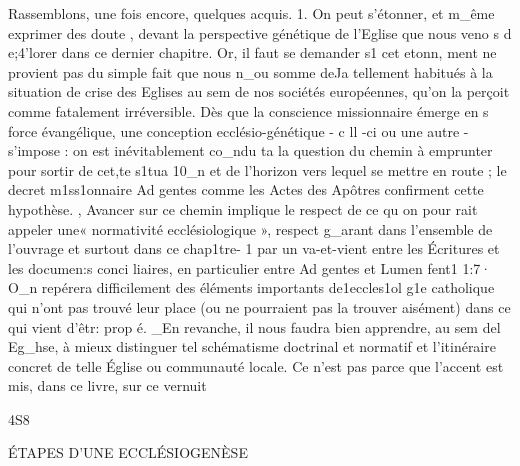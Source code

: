 {Rassemblons, une fois encore, quelques acquis.
1.	On peut s'étonner, et m_ême exprimer des doute , devant la perspective génétique de l'Eglise que nous veno s d e;4'lorer dans ce dernier chapitre. Or, il faut se demander s1 cet etonn, ment ne provient pas du simple fait que nous n_ou somme deJa tellement habitués à la situation de crise des Eglises au sem de nos sociétés européennes, qu'on la perçoit comme fatalement irréversible. Dès que la conscience missionnaire émerge en s force évangélique, une conception ecclésio-génétique -	c ll -ci ou une autre -	s'impose : on est inévitablement co_ndu ta la question du chemin à emprunter pour sortir de cet,te s1tua 10_n et de l'horizon vers lequel se mettre en route ; le decret m1ss1onnaire Ad gentes comme les Actes des Apôtres confirment cette
hypothèse.	,
Avancer sur ce chemin implique le respect de ce qu on pour
rait appeler une« normativité ecclésiologique », respect g_arant dans l'ensemble de l'ouvrage et surtout dans ce chap1tre- 1 par un va-et-vient entre les Écritures et les documen:s conci­
liaires, en particulier entre Ad gentes et Lumen fent1 1:7· O_n repérera difficilement des éléments importants de1eccles1ol g1e catholique qui n'ont pas trouvé leur place (ou ne pourraient pas la trouver aisément) dans ce qui vient d'êtr: prop é. _En revanche, il nous faudra bien apprendre, au sem del  Eg_hse, à mieux distinguer tel schématisme doctrinal et normatif et l'itinéraire concret de telle Église ou communauté locale. Ce n'est pas parce que l'accent est mis, dans ce livre, sur ce vernuit

4S8
 
ÉTAPES D'UNE ECCLÉSIOGENÈSE

}
